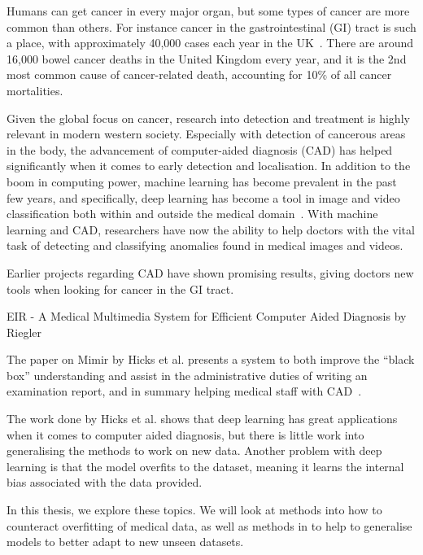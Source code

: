 Humans can get cancer in every major organ, but some types of cancer are more common than others.    
For instance cancer in the gastrointestinal (GI) tract is such a place, with approximately 40,000 cases each year in the UK~\cite{UKCancerBowel}. There are around 16,000 bowel cancer deaths in the United Kingdom every year, and it is the 2nd most common cause of cancer-related death, accounting for 10\% of all cancer mortalities.

Given the global focus on cancer, research into detection and treatment is highly relevant in modern western society. 
Especially with detection of cancerous areas in the body, the advancement of computer-aided diagnosis (CAD) has helped significantly when it comes to early detection and localisation. In addition to the boom in computing power, machine learning has become prevalent in the past few years, and specifically, deep learning has become a tool in image and video classification both within and outside the medical domain~\cite{NIPS2012_4824,DBLP:journals/corr/SimonyanZ14a,DBLP:journals/corr/SimonyanZ14a,DBLP:journals/corr/HeZRS15,DBLP:journals/corr/SzegedyIV16}. 
With machine learning and CAD, researchers have now the ability to help doctors with the vital task of detecting and classifying anomalies found in medical images and videos.

Earlier projects regarding CAD have shown promising results, giving doctors new tools when looking for cancer in the GI tract.

EIR - A Medical Multimedia System for Efficient
Computer Aided Diagnosis by Riegler 

The paper on Mimir by Hicks et al. presents a system to both improve the ``black box'' understanding and assist in the administrative duties of writing an examination report, and in summary helping medical staff with CAD~\cite{25953}. 

The work done by Hicks et al. shows that deep learning has great applications when it comes to computer aided diagnosis, but there is little work into generalising the methods to work on new data. Another problem with deep learning is that the model overfits to the dataset, meaning it learns the internal bias associated with the data provided. 

In this thesis, we explore these topics. We will look at methods into how to counteract overfitting of medical data, as well as methods in to help to generalise models to better adapt to new unseen datasets.

